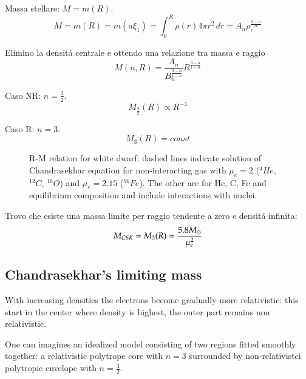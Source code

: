 Massa stellare: $M=m(R)$.
\begin{equation*}
M=m(R)=m(a\xi_1)=\int_0^R\rho(r)4\pi r^2\,dr=A_n\rho_c^{\frac{3-n}{2n}}
\end{equation*}

Elimino la densit\'a centrale e ottendo una relazione tra massa e raggio
\begin{equation*}
M(n,R)=\frac{A_n}{B_n^{\frac{3-n}{1-n}}}R^{\frac{3-n}{1-n}}
\end{equation*}

\begin{itemize*}
\item Caso NR: $n=\frac{3}{2}$.
\begin{equation*}
M_{\frac{3}{2}}(R)\propto R^{-3}
\end{equation*}
\item Caso R: $n=3$.
\begin{equation*}
M_3(R)=const
\end{equation*}
\end{itemize*}

\begin{figure}[!ht]
\centering
\caption{R-M relation for white dwarf: dashed lines indicate solution of Chandrasekhar equation for non-interacting gas with $\mu_e=2$ ($^4He$, $^{12}C$, $^{16}O$) and $\mu_e=2.15$ ($^{56}Fe$). The other are for He, C, Fe and equilibrium composition and include interactions with nuclei.}
\end{figure}


Trovo che esiste una massa limite per raggio tendente a zero e densit\'a infinita:
\begin{equation*}
M_{CSK}=M_3(R)=\frac{5.8M_{\odot}}{\mu_e^2}
\end{equation*}

\subsection{Chandrasekhar's limiting mass}

With increasing densities the electrons become gradually more relativistic: this start in the center where density is highest, the outer part remains non relativistic.

One can imagines an idealized model consisting of two regions fitted smoothly together: a relativistic polytrope core with $n=3$ surrounded by non-relativistci polytropic envelope with $n=\frac{3}{2}$.

